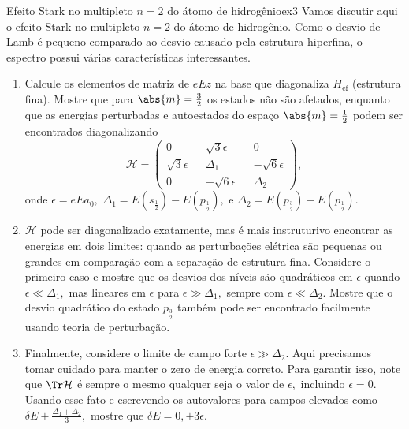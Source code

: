 \begin{exercício}{Efeito Stark no multipleto \(n = 2\) do átomo de hidrogênio}{ex3}
   Vamos discutir aqui o efeito Stark no multipleto \(n = 2\) do átomo de hidrogênio. Como o desvio de Lamb é pequeno comparado ao desvio causado pela estrutura hiperfina, o espectro possui várias características interessantes.
   \begin{enumerate}[label=(\alph*)]
      \item Calcule os elementos de matriz de \(e E z\) na base que diagonaliza \(H_{\mathrm{ef}}\) (estrutura fina). Mostre que para \(\abs{m} = \frac32\) os estados não são afetados, enquanto que as energias perturbadas e autoestados do espaço \(\abs{m} = \frac12\) podem ser encontrados diagonalizando
         \begin{equation*}
            \mathcal{H} = \begin{pmatrix}
               0 && \sqrt{3} \epsilon && 0\\
               \sqrt{3} \epsilon && \Delta_1 && - \sqrt{6} \epsilon\\
               0 && - \sqrt{6} \epsilon && \Delta_2
            \end{pmatrix},
         \end{equation*}
         onde \(\epsilon = e E a_0,\) \(\Delta_1 = E(s_{\frac12}) - E(p_{\frac12}),\) e \(\Delta_2 = E(p_{\frac32}) - E(p_{\frac12}).\)
      \item \(\mathcal{H}\) pode ser diagonalizado exatamente, mas é mais instruturivo encontrar as energias em dois limites: quando as perturbações elétrica são pequenas ou grandes em comparação com a separação de estrutura fina. Considere o primeiro caso e mostre que os desvios dos níveis são quadráticos em \(\epsilon\) quando \(\epsilon \ll \Delta_1,\) mas lineares em \(\epsilon\) para \(\epsilon \gg \Delta_1,\) sempre com \(\epsilon \ll \Delta_2.\) Mostre que o desvio quadrático do estado \(p_{\frac32}\) também pode ser encontrado facilmente usando teoria de perturbação.
      \item Finalmente, considere o limite de campo forte \(\epsilon \gg \Delta_2.\) Aqui precisamos tomar cuidado para manter o zero de energia correto. Para garantir isso, note que \(\Tr\mathcal{H}\) é sempre o mesmo qualquer seja o valor de \(\epsilon,\) incluindo \(\epsilon = 0.\) Usando esse fato e escrevendo os autovalores para campos elevados como \(\delta E + \frac{\Delta_1 + \Delta_2}{3},\) mostre que \(\delta E = 0, \pm 3\epsilon.\)
   \end{enumerate}
\end{exercício}
